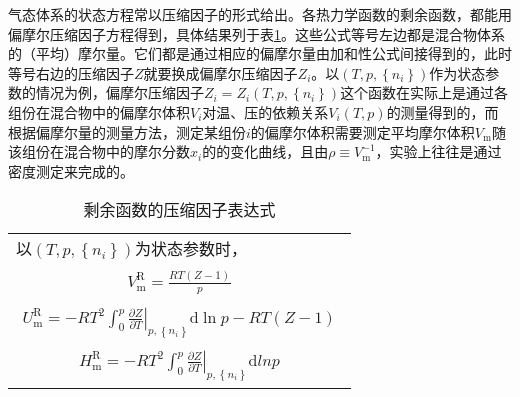 \documentclass[main.tex]{subfiles}
\begin{document}
气态体系的状态方程常以压缩因子的形式给出。各热力学函数的剩余函数，都能用偏摩尔压缩因子方程得到，具体结果列于表\ref{tab:residule_functions_compressibility_factor}。这些公式等号左边都是混合物体系的（平均）摩尔量。它们都是通过相应的偏摩尔量由加和性公式间接得到的，此时等号右边的压缩因子$Z$就要换成偏摩尔压缩因子$Z_i$。以$\left(T,p,\left\{n_i\right\}\right)$作为状态参数的情况为例，偏摩尔压缩因子$Z_i=Z_i\left(T,p,\left\{n_i\right\}\right)$这个函数在实际上是通过各组份在混合物中的偏摩尔体积$V_i$对温、压的依赖关系$V_i\left(T,p\right)$的测量得到的，而根据偏摩尔量的测量方法，测定某组份$i$的偏摩尔体积需要测定平均摩尔体积$V_\text{m}$随该组份在混合物中的摩尔分数$x_i$的的变化曲线，且由$\rho\equiv V^{-1}_\text{m}$，实验上往往是通过密度测定来完成的。
\begin{longtable}{m{}}
    \caption{剩余函数的压缩因子表达式}                                   \label{tab:residule_functions_compressibility_factor}                                                                                                                                                  \\
    \hline
    以$\left(T,p,\left\{n_i\right\}\right)$为状态参数时，                                                                                                                                                                                                                   \\[-4ex]
    \begin{align}
        V_\text{m}^\text{R}=\frac{RT\left(Z-1\right)}{p}
    \end{align}                                                                                                                                                                                                                 \\[-8ex]
    \begin{align}
        U_\text{m}^\text{R}=-RT^2\int_0^p\left.\frac{\partial Z}{\partial T}\right|_{p,\left\{n_i\right\}}\mathrm{d}\ln p-RT\left(Z-1\right)
    \end{align}                                                                                                                             \\[-8ex]
    \begin{align}H_\text{m}^\text{R}=-RT^2\int_0^p\left.\frac{\partial Z}{\partial T}\right|_{p,\left\{n_i\right\}}\mathrm{d}ln p\end{align}                                                                                                                        \\[-8ex]

\end{longtable}
\end{document}

